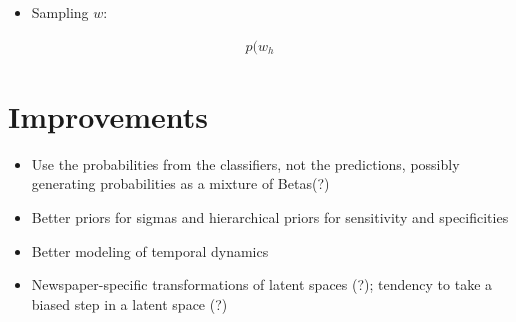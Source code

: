\documentclass[11pt]{article}
\theoremstyle{plain}
\theoremstyle{definition}
\begin{document}
\begin{itemize}
\item Sampling $w$:
\end{itemize}
\begin{align*}
p(w_{h}
\end{align*}


\section{Improvements}


\begin{itemize}
\item Use the probabilities from the classifiers, not the predictions, possibly generating probabilities as a mixture of Betas(?)
\item Better priors for sigmas and hierarchical priors for sensitivity and specificities
\item Better modeling of temporal dynamics
\item Newspaper-specific transformations of latent spaces (?); tendency to take a biased step in a latent space (?)
\end{itemize}
 
\end{document}
